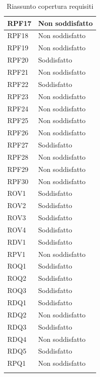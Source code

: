 \begin{longtable}{| p{2.5cm} | p{3cm} |}
	RPF17 & Non soddisfatto \\ \hline
	RPF18 & Non soddisfatto \\ \hline
	RPF19 & Non soddisfatto \\ \hline
	RPF20 & Soddisfatto \\ \hline
	RPF21 & Non soddisfatto \\ \hline
	RPF22 & Soddisfatto \\ \hline
	RPF23 & Non soddisfatto \\ \hline
	RPF24 & Non soddisfatto \\ \hline
	RPF25 & Non soddisfatto \\ \hline
	RPF26 & Non soddisfatto \\ \hline
	RPF27 & Soddisfatto \\ \hline
	RPF28 & Non soddisfatto \\ \hline
	RPF29 & Non soddisfatto \\ \hline
	RPF30 & Non soddisfatto \\ \hline
	ROV1 & Soddisfatto \\ \hline
	ROV2 & Soddisfatto \\ \hline
	ROV3 & Soddisfatto \\ \hline
	ROV4 & Soddisfatto \\ \hline
	RDV1 & Soddisfatto \\ \hline
	RPV1 & Non soddisfatto \\ \hline
	ROQ1 & Soddisfatto \\ \hline
	ROQ2 & Soddisfatto \\ \hline
	ROQ3 & Soddisfatto \\ \hline
	RDQ1 & Soddisfatto \\ \hline
	RDQ2 & Non soddisfatto \\ \hline
	RDQ3 & Soddisfatto \\ \hline
	RDQ4 & Non soddisfatto \\ \hline
	RDQ5 & Soddisfatto \\ \hline
	RPQ1 & Non soddisfatto \\ \hline
	\caption{Riassunto copertura requisiti}
\end{longtable}


	
